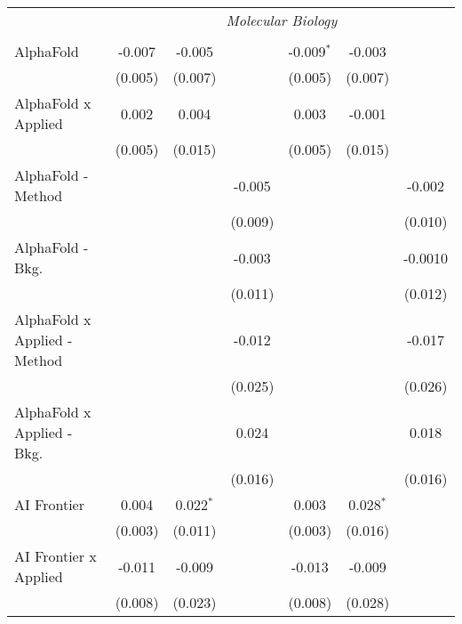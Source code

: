 \begin{tabular}{lcccccc}
 & \multicolumn{6}{c}{\textit{Molecular Biology}} \\ \\
   AlphaFold                      & -0.007  & -0.005       &                & -0.009$^{*}$ & -0.003         &   \\   
                                  & (0.005) & (0.007)      &                & (0.005)      & (0.007)        &   \\   
   AlphaFold x Applied            & 0.002   & 0.004        &                & 0.003        & -0.001         &   \\   
                                  & (0.005) & (0.015)      &                & (0.005)      & (0.015)        &   \\   
   AlphaFold - Method             &         &              & -0.005         &              &                & -0.002\\   
                                  &         &              & (0.009)        &              &                & (0.010)\\   
   AlphaFold - Bkg.               &         &              & -0.003         &              &                & -0.0010\\   
                                  &         &              & (0.011)        &              &                & (0.012)\\   
   AlphaFold x Applied - Method   &         &              & -0.012         &              &                & -0.017\\   
                                  &         &              & (0.025)        &              &                & (0.026)\\   
   AlphaFold x Applied - Bkg.     &         &              & 0.024          &              &                & 0.018\\   
                                  &         &              & (0.016)        &              &                & (0.016)\\   
   AI Frontier                    & 0.004   & 0.022$^{*}$  &                & 0.003        & 0.028$^{*}$    &   \\   
                                  & (0.003) & (0.011)      &                & (0.003)      & (0.016)        &   \\   
   AI Frontier x Applied          & -0.011  & -0.009       &                & -0.013       & -0.009         &   \\   
                                  & (0.008) & (0.023)      &                & (0.008)      & (0.028)        &   \\   

\end{tabular}
